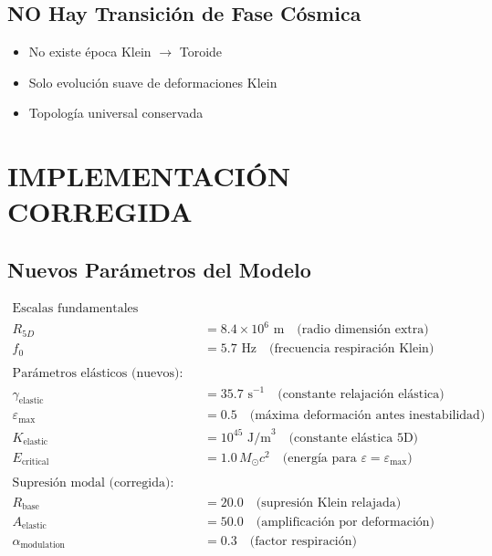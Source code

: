 \documentclass[12pt,a4paper]{article}
\begin{document}
\subsection{NO Hay Transición de Fase Cósmica}

\begin{itemize}
\item[\times] No existe época Klein $\to$ Toroide
\item[\checkmark] Solo evolución suave de deformaciones Klein
\item[\checkmark] Topología universal conservada
\end{itemize}

\section{IMPLEMENTACIÓN CORREGIDA}

\subsection{Nuevos Parámetros del Modelo}

\begin{align}
\text{Escalas fundamentales (conservadas):}\\
R_{5D} &= 8.4 \times 10^6 \text{ m} \quad \text{(radio dimensión extra)}\\
f_0 &= 5.7 \text{ Hz} \quad \text{(frecuencia respiración Klein)}\\
\\
\text{Parámetros elásticos (nuevos):}\\
\gamma_{\text{elastic}} &= 35.7 \text{ s}^{-1} \quad \text{(constante relajación elástica)}\\
\varepsilon_{\max} &= 0.5 \quad \text{(máxima deformación antes inestabilidad)}\\
K_{\text{elastic}} &= 10^{45} \text{ J/m}^3 \quad \text{(constante elástica 5D)}\\
E_{\text{critical}} &= 1.0 \, M_\odot c^2 \quad \text{(energía para } \varepsilon = \varepsilon_{\max})\\
\\
\text{Supresión modal (corregida):}\\
R_{\text{base}} &= 20.0 \quad \text{(supresión Klein relajada)}\\
A_{\text{elastic}} &= 50.0 \quad \text{(amplificación por deformación)}\\
\alpha_{\text{modulation}} &= 0.3 \quad \text{(factor respiración)}
\end{align}
\end{document}
